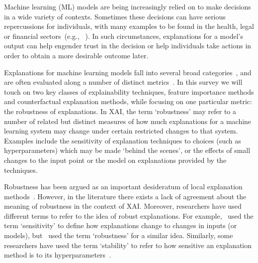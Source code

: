 \documentclass[sigconf]{acmart}
\newcommand{\ja}[1]{\textcolor{blue}{#1}}
\newcommand{\s}[1]{\textcolor{red}{#1}}
\begin{document}

Machine learning (ML) models are being increasingly relied on to make decisions in a wide variety of contexts. Sometimes these decisions can have serious repercussions for individuals, with many examples to be found in the health, legal or financial sectors~(e.g., ~\cite{Angwin_web_2016}). In such circumstances, explanations for a model's output can help engender trust in the decision or help individuals take actions in order to obtain a more desirable outcome later. 

Explanations for machine learning models fall into several broad categories~\cite{Gilpin_dsaa_2018}, and are often evaluated along a number of distinct metrics~\cite{Bhatt_ijcai_2020}. In this survey we will touch on two key classes of explainability techniques, feature importance methods and counterfactual explanation methods, while focusing on one particular metric: the robustness of explanations. In XAI, the term `robustness' may refer to a number of related but distinct measures of how much explanations for a machine learning system may change under certain restricted changes to that system. Examples include the sensitivity of explanation techniques to choices (such as hyperparameters) which may be made `behind the scenes', or the effects of small changes to the input point or the model on explanations provided by the techniques.



Robustness has been argued as an important desideratum of local explanation methods~\cite{Hancox-Li_fat_2020}. However, in the literature there exists a lack of agreement about the meaning of robustness in the context of XAI. Moreover, researchers have used different terms to refer to the idea of robust explanations. For example,~\cite{Yang_arXiv_2019} used the term `sensitivity' to define how explanations change to changes in inputs (or models), but~\cite{Melis_arXiv_2018} used the term `robustness' for a similar idea. Similarly, some researchers have used the term `stability' to refer to how sensitive an explanation method is to its hyperparameters~\cite{Warnecke_arXiv_2020}.
\end{document}
